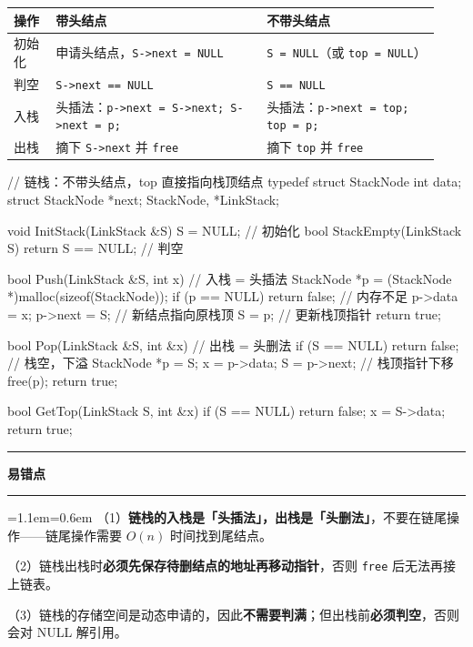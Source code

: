 \documentclass[11pt,openany,UTF8]{ctexbook}
\newcommand{\callouthead}[2]{%
  \par\addvspace{7pt}\noindent
  {\color{#1}\rule[-0.15em]{3pt}{1.05em}}\hspace{0.5em}%
  {\bfseries\color{#1}#2}\par\nobreak\vspace{-0.35em}%
  {\color{rulesep}\hrule height 0.4pt}\nobreak\vspace{0.45em}%
  \begingroup\small\setlength{\parindent}{0pt}%
  \leftskip=1.1em\rightskip=0.6em\noindent\ignorespaces}
\newcommand{\calloutend}{\par\endgroup\addvspace{7pt}}
\newenvironment{callwarn}[1]{\callouthead{warnbar}{#1}}{\calloutend}
\begin{document}
\begingroup\small\setlength{\tabcolsep}{4.0pt}
\begin{longtable}{@{}L{0.0993\linewidth}L{0.4518\linewidth}L{0.3774\linewidth}@{}}
\toprule
\textbf{操作} & \textbf{带头结点} & \textbf{不带头结点} \\
\midrule
\endhead
初始化 & 申请头结点，\texttt{S->\allowbreak{}next =\allowbreak{} NULL} & \texttt{S =\allowbreak{} NULL}（或 \texttt{top =\allowbreak{} NULL}） \\
判空 & \texttt{S->\allowbreak{}next =\allowbreak{}=\allowbreak{} NULL} & \texttt{S =\allowbreak{}=\allowbreak{} NULL} \\
入栈 & 头插法：\texttt{p->\allowbreak{}next =\allowbreak{} S->\allowbreak{}next;\allowbreak{} S->\allowbreak{}next =\allowbreak{} p;\allowbreak{}} & 头插法：\texttt{p->\allowbreak{}next =\allowbreak{} top;\allowbreak{} top =\allowbreak{} p;\allowbreak{}} \\
出栈 & 摘下 \texttt{S->\allowbreak{}next} 并 \texttt{free} & 摘下 \texttt{top} 并 \texttt{free} \\
\bottomrule
\end{longtable}
\endgroup

\begin{codebox}
// 链栈：不带头结点，top 直接指向栈顶结点
typedef struct StackNode {
    int data;
    struct StackNode *next;
} StackNode, *LinkStack;

void InitStack(LinkStack &S) { S = NULL; }                   // 初始化
bool StackEmpty(LinkStack S) { return S == NULL; }           // 判空

bool Push(LinkStack &S, int x) {                             // 入栈 = 头插法
    StackNode *p = (StackNode *)malloc(sizeof(StackNode));
    if (p == NULL) return false;                             // 内存不足
    p->data = x;
    p->next = S;                                             // 新结点指向原栈顶
    S = p;                                                   // 更新栈顶指针
    return true;
}

bool Pop(LinkStack &S, int &x) {                             // 出栈 = 头删法
    if (S == NULL) return false;                             // 栈空，下溢
    StackNode *p = S;
    x = p->data;
    S = p->next;                                             // 栈顶指针下移
    free(p);
    return true;
}

bool GetTop(LinkStack S, int &x) {
    if (S == NULL) return false;
    x = S->data;
    return true;
}
\end{codebox}

\begin{callwarn}{易错点}
（1）\textbf{链栈的入栈是「头插法」，出栈是「头删法」}，不要在链尾操作——链尾操作需要 $O(n)$ 时间找到尾结点。

（2）链栈出栈时\textbf{必须先保存待删结点的地址再移动指针}，否则 \texttt{free} 后无法再接上链表。

（3）链栈的存储空间是动态申请的，因此\textbf{不需要判满}；但出栈前\textbf{必须判空}，否则会对 NULL 解引用。

\end{callwarn}
\end{document}
